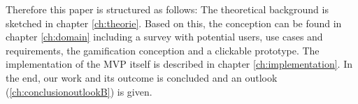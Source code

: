 Therefore this paper is structured as follows:
The theoretical background is sketched in chapter \ref{ch:theorie}. Based on this, the conception can be found in chapter \ref{ch:domain} including a survey with potential users, use cases and requirements, the gamification conception and a clickable prototype. The implementation of the \acs{MVP} itself is described in chapter \ref{ch:implementation}. In the end, our work and its outcome is concluded and an outlook (\ref{ch:conclusionoutlookB}) is given.


%
%

%		





